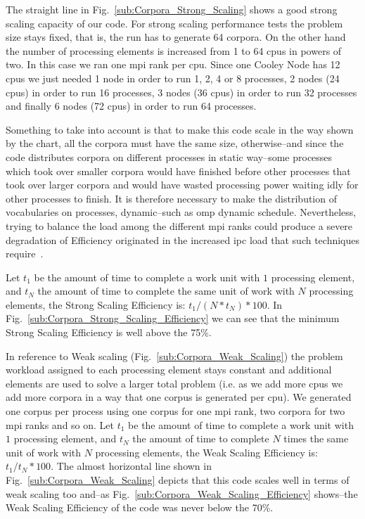{The straight line in Fig.~\ref{sub:Corpora_Strong_Scaling} shows a good strong scaling capacity of our code. For strong scaling performance tests the problem size stays fixed, that is, the run has to generate 64 corpora. On the other hand the number of processing elements is increased from 1 to 64 \glspl{cpu} in powers of two. In this case we ran one \gls{mpi} rank per \gls{cpu}. Since one Cooley Node has 12 \glspl{cpu} we just needed 1 node in order to run 1, 2, 4 or 8 processes, 2 nodes (24 \glspl{cpu}) in order to run 16 processes, 3 nodes (36 \glspl{cpu}) in order to run 32 processes and finally 6 nodes (72 \glspl{cpu}) in order to run 64 processes.

Something to take into account is that to make this code scale in the way shown by the chart, all the corpora must have the same size, otherwise--and since the code distributes corpora on different processes in static way--some processes which took over smaller corpora would have finished before other processes that took over larger corpora and would have wasted processing power waiting idly for other processes to finish. It is therefore necessary to make the distribution of vocabularies on processes, dynamic--such as \gls{omp} dynamic schedule. Nevertheless, trying to balance the load among the different \gls{mpi} ranks could produce a severe degradation of Efficiency originated in the increased \gls{ipc} load that such techniques require~\cite{hu2012biophysically}.

Let $t_1$ be the amount of time to complete a work unit with $1$ processing element, and $t_N$ the amount of time to complete the same unit of work with $N$ processing elements, the Strong Scaling Efficiency is: $t_1 / (N * t_N) * 100$. In Fig.~\ref{sub:Corpora_Strong_Scaling_Efficiency} we can see that the minimum Strong Scaling Efficiency is well above the 75\%.

In reference to Weak scaling (Fig.~\ref{sub:Corpora_Weak_Scaling}) the problem workload assigned to each processing element stays constant and additional elements are used to solve a larger total problem (i.e. as we add more \glspl{cpu} we add more corpora in a way that one corpus is generated per \gls{cpu}). We generated one corpus per process using one corpus for one \gls{mpi} rank, two corpora for two \gls{mpi} ranks and so on. Let $t_1$ be the amount of time to complete a work unit with $1$ processing element, and $t_N$ the amount of time to complete $N$ times the same unit of work with $N$ processing elements, the Weak Scaling Efficiency is: $t_1 / t_N * 100$. The almost horizontal line shown in Fig.~\ref{sub:Corpora_Weak_Scaling} depicts that this code scales well in terms of weak scaling too and--as Fig.~\ref{sub:Corpora_Weak_Scaling_Efficiency} shows--the Weak Scaling Efficiency of the code was never below the 70\%.
}










